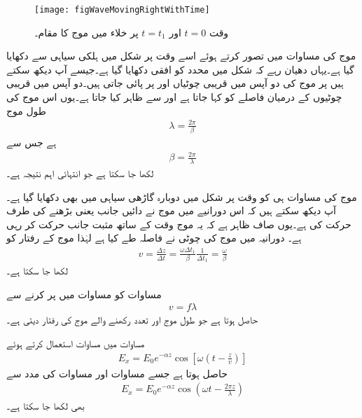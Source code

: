 \begin{figure}
\centering
\texttt{[image: figWaveMovingRightWithTime]}
\caption{وقت $t=0$ اور $t=t_1$ پر خلاء میں موج کا مقام۔}
\label{شکل_موج_وقت_کے_ساتھ_مثبت_چلتی_موج}
\end{figure}


موج کی مساوات  میں  تصور کرتے ہوئے اسے وقت  پر شکل  میں ہلکی سیاہی سے دکھایا گیا ہے۔یہاں دھیان رہے کہ شکل میں  محدد کو افقی دکھایا گیا ہے۔جیسے آپ دیکھ سکتے ہیں  پر موج کی دو آپس میں قریبی چوٹیاں  اور  پر پائی جاتی ہیں۔دو آپس میں قریبی چوٹیوں کے درمیان فاصلے کو  کہا جاتا ہے  اور  سے ظاہر کیا جاتا ہے۔یوں اس موج کی طول موج
\begin{align}\label{مساوات_موج_زاویائی_مستقل_اور_طول_موج_الف}
\lambda=\frac{2\pi}{\beta}
\end{align}
ہے جس سے
\begin{align}\label{مساوات_موج_زاویائی_مستقل_اور_طول_موج_ب}
\beta=\frac{2\pi}{\lambda}
\end{align}
لکھا جا سکتا ہے جو انتہائی اہم نتیجہ ہے۔

موج کی مساوات ہی کو وقت  پر شکل  میں دوبارہ گاڑھی سیاہی میں بھی دکھایا گیا ہے۔آپ دیکھ سکتے ہیں کہ اس دورانیے میں موج نے دائیں جانب یعنی  بڑھنے کی طرف حرکت کی ہے۔یوں صاف ظاہر ہے کہ یہ موج وقت کے ساتھ مثبت  جانب حرکت کر رہی ہے۔ دورانیہ  میں موج کی چوٹی نے  فاصلہ طے کیا ہے لہٰذا موج کے رفتار کو
\begin{align}\label{مساوات_موج_رفتار_اور_تعدد}
v=\frac{\Delta z}{\Delta t}=\frac{\omega \Delta t_1}{\beta} \frac{1}{\Delta t_1}=\frac{\omega}{\beta}
\end{align}
لکھا جا سکتا ہے۔

مساوات  کو  مساوات  میں پر کرنے سے
\begin{align}
v=f \lambda
\end{align}
حاصل ہوتا ہے جو  طول موج  اور  تعدد رکھنے والے موج کی رفتار  دیتی ہے۔

مساوات  میں مساوات  استعمال کرتے ہوئے
\begin{align}
E_x=E_0 e^{-\alpha z} \cos \left[ \omega \left(t-\frac{z}{v} \right)\right]
\end{align}
حاصل ہوتا ہے جسے مساوات  اور مساوات  کی مدد سے
\begin{align}
E_x=E_0 e^{-\alpha z} \cos \left(\omega  t-\frac{2 \pi z}{\lambda}\right)
\end{align}
بھی لکھا جا سکتا ہے۔

